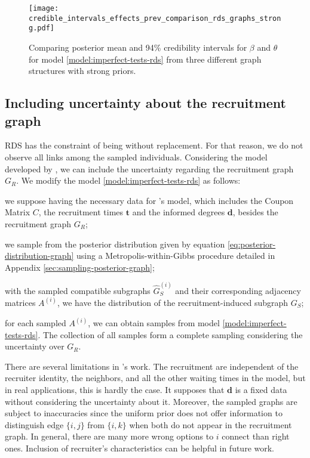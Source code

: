 \begin{figure}[htb]
  \centering
  \caption{\label{fig:credible_intervals_effects_prev_comparison_rds_graphs_strong}Comparing
  posterior mean and 94\% credibility intervals for $\beta$ and $\theta$ for model
  \eqref{model:imperfect-tests-rds} from three different graph structures with
  strong priors.}
  \texttt{[image: credible\_intervals\_effects\_prev\_comparison\_rds\_graphs\_strong.pdf]}
\end{figure}

\subsection{Including uncertainty about the recruitment graph}
\label{sec:including_uncertainty_recruitment_graph}

RDS has the constraint of being without replacement. For that reason, we do
not observe all links among the sampled individuals. Considering the model
developed by 
\textcite{crawford2016}, we can include the uncertainty regarding the
recruitment graph $G_R$. We modify the model \eqref{model:imperfect-tests-rds} as
follows: 
\begin{alineas}
  \item we suppose having the necessary data for \textcite{crawford2016}'s
  model, which includes the Coupon Matrix $C$, the recruitment times
  $\boldsymbol{t}$ and the informed degrees $\boldsymbol{d}$, besides the
  recruitment graph $G_R$;
  \item we sample from the posterior distribution given by equation
  \eqref{eq:posterior-distribution-graph} using a Metropolis-within-Gibbs
  procedure detailed in Appendix \ref{sec:sampling-posterior-graph};
  \item with the sampled compatible subgraphs $\hat{G}_S^{(i)}$ and their
  corresponding adjacency matrices $A^{(i)}$, we have the distribution of the
  recruitment-induced subgraph $G_S$;
  \item for each sampled $A^{(i)}$, we can obtain samples from model
  \eqref{model:imperfect-tests-rds}. The collection of all samples form a
  complete sampling considering the uncertainty over $G_R$. 
\end{alineas}

There are several limitations in \textcite{crawford2016}'s work. The
recruitment are independent of the recruiter identity, the neighbors,
and all the other waiting times in the model, but in real applications, this is
hardly the case. It supposes that $\boldsymbol{d}$ is a fixed data without
considering the uncertainty about it. Moreover, the sampled graphs are subject
to inaccuracies since the uniform prior does not offer information to
distinguish edge $\{i, j\}$ from $\{i, k\}$ when both do not appear in the
recruitment graph. In general, there are many more wrong options to $i$
connect than right ones. Inclusion of recruiter's characteristics can be
helpful in future work. 

